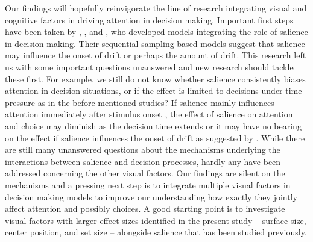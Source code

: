 Our findings will hopefully reinvigorate the line of research integrating visual and cognitive factors in driving attention in decision making. Important first steps have been taken by \cite{chen2013}, \cite{navalpakkam2010}, and \cite{towal2013a}, who developed models integrating the role of salience in decision making. Their sequential sampling based models suggest that salience may influence the onset of drift or perhaps the amount of drift. This research left us with some important questions unanswered and new research should tackle these first. For example, we still do not know whether salience consistently biases attention in decision situations, or if the effect is limited to decisions under time pressure as in the before mentioned studies? If salience mainly influences attention immediately after stimulus onset \citep{theeuwes2010, orquin2015a}, the effect of salience on attention and choice may diminish as the decision time extends or it may have no bearing on the effect if salience influences the onset of drift as suggested by \cite{chen2013}. While there are still many unanswered questions about the mechanisms underlying the interactions between salience and decision processes, hardly any have been addressed concerning the other visual factors. Our findings are silent on the mechanisms and a pressing next step is to integrate multiple visual factors in decision making models to improve our understanding how exactly they jointly affect attention and possibly choices. A good starting point is to investigate visual factors with larger effect sizes identified in the present study -- surface size, center position, and set size -- alongside salience that has been studied previously.   \\   

